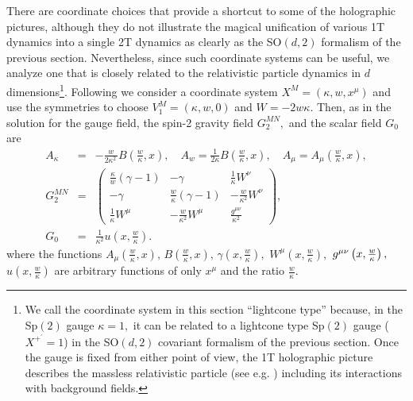 \documentclass[a4paper,12pt]{article}
\begin{document}
There are coordinate choices that provide a shortcut to some of the
holographic pictures, although they do not illustrate the magical
unification of various 1T dynamics into a single 2T dynamics as clearly as
the SO$\left( d,2\right) $ formalism of the previous section. Nevertheless,
since such coordinate systems can be useful, we analyze one that is closely
related to the relativistic particle dynamics in $d$ dimensions\footnote{%
We call the coordinate system in this section ``lightcone type'' because, in
the Sp$\left( 2\right) $ gauge $\kappa =1,$ it can be related to a lightcone
type Sp$\left( 2\right) $ gauge ($X^{+^{\prime }}=1$) in the SO$\left(
d,2\right) $ covariant formalism of the previous section. Once the gauge is
fixed from either point of view, the 1T holographic picture describes the
massless relativistic particle (see e.g. \cite{survey2T}) including its
interactions with background fields.}. Following \cite{emgrav} we consider a
coordinate system $X^{M}=\left( \kappa ,w,x^{\mu }\right) $ and use the
symmetries to choose $V_{1}^{M}=(\kappa ,w,0)$ and $W=-2w\kappa $. Then, as
in \cite{emgrav} the solution for the gauge field, the spin-2 gravity field $%
G_{2}^{MN},$ and the scalar field $G_{0}$ are
\begin{eqnarray}
A_{\kappa } &=&-\frac{w}{2\kappa ^{2}\,}B\left( \frac{w}{\kappa },x\right)
,\quad A_{w}=\frac{1}{2\kappa }B\left( \frac{w}{\kappa },x\right) ,\quad
A_{\mu }=A_{\mu }\left( \frac{w}{\kappa },x\right) , \\
G_{2}^{MN} &=&\left(
\begin{array}{ccc}
\frac{\kappa }{w}\left( \gamma -1\right) & -\gamma & \frac{1}{\kappa }W^{\nu
} \\
-\gamma & \frac{w}{\kappa }\left( \gamma -1\right) & -\frac{w}{\kappa ^{2}}%
W^{\nu } \\
\frac{1}{\kappa }W^{\mu } & -\frac{w}{\kappa ^{2}}W^{\mu } & \frac{g^{\mu
\nu }}{\kappa ^{2}}
\end{array}
\right) ,  \label{G2} \\
G_{0} &=&\frac{1}{\kappa ^{2}}u\left( x,\frac{w}{\kappa }\right) .
\end{eqnarray}
where the functions $A_{\mu }\left( \frac{w}{\kappa },x\right) ,\,B\left(
\frac{w}{\kappa },x\right) ,\,\gamma \left( x,\frac{w}{\kappa }\right) ,$ $%
W^{\mu }\left( x,\frac{w}{\kappa }\right) ,$ $g^{\mu \nu }\left( x,\frac{w}{%
\kappa }\right) ,$ $u\left( x,\frac{w}{\kappa }\right) $ are arbitrary
functions of only $x^{\mu }$ and the ratio $\frac{w}{\kappa }$.
\end{document}
